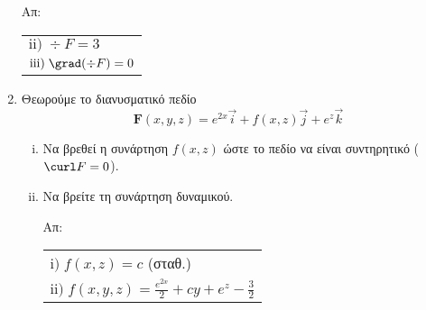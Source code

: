 \begin{enumerate}
\hfill Απ: \begin{tabular}{l}
  $\mathrm{ii)}\; \div F=3$ \\
  $\mathrm{iii)}\; \grad(\div F)=0$

\end{tabular}

\item Θεωρούμε το διανυσματικό πεδίο
\[
\boldsymbol{F}(x,y,z)=e^{2x}\vec{i}+f(x,z)\vec{j}+e^z\vec{k}
\]
\begin{enumerate}[i)]
\item Να βρεθεί η συνάρτηση $f(x,z)$ ώστε το πεδίο να είναι συντηρητικό ($\curl F=0$).
\item Να βρείτε τη συνάρτηση δυναμικού.

\hfill Απ: \begin{tabular}{l}
  $\mathrm{i)}\; f(x,z)=c$ (σταθ.) \\
  $\mathrm{ii)}\;f(x,y,z)=\frac{e^{2x}}{2}+cy+e^z-\frac{3}{2}$
\end{tabular}

\end{enumerate}
\end{enumerate}


